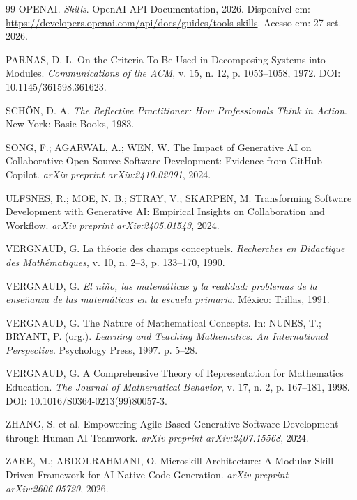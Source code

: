 \documentclass[preprint,12pt,authoryear]{elsarticle}
\begin{document}
\begin{thebibliography}{99}
OPENAI. \emph{Skills}. OpenAI API Documentation, 2026. Disponível em: \url{https://developers.openai.com/api/docs/guides/tools-skills}. Acesso em: 27 set. 2026.

PARNAS, D. L. On the Criteria To Be Used in Decomposing Systems into Modules. \emph{Communications of the ACM}, v. 15, n. 12, p. 1053--1058, 1972. DOI: 10.1145/361598.361623.

SCHÖN, D. A. \emph{The Reflective Practitioner: How Professionals Think in Action}. New York: Basic Books, 1983.

SONG, F.; AGARWAL, A.; WEN, W. The Impact of Generative AI on Collaborative Open-Source Software Development: Evidence from GitHub Copilot. \emph{arXiv preprint arXiv:2410.02091}, 2024.

ULFSNES, R.; MOE, N. B.; STRAY, V.; SKARPEN, M. Transforming Software Development with Generative AI: Empirical Insights on Collaboration and Workflow. \emph{arXiv preprint arXiv:2405.01543}, 2024.

VERGNAUD, G. La théorie des champs conceptuels. \emph{Recherches en Didactique des Mathématiques}, v. 10, n. 2--3, p. 133--170, 1990.

VERGNAUD, G. \emph{El niño, las matemáticas y la realidad: problemas de la enseñanza de las matemáticas en la escuela primaria}. México: Trillas, 1991.

VERGNAUD, G. The Nature of Mathematical Concepts. In: NUNES, T.; BRYANT, P. (org.). \emph{Learning and Teaching Mathematics: An International Perspective}. Psychology Press, 1997. p. 5--28.

VERGNAUD, G. A Comprehensive Theory of Representation for Mathematics Education. \emph{The Journal of Mathematical Behavior}, v. 17, n. 2, p. 167--181, 1998. DOI: 10.1016/S0364-0213(99)80057-3.

ZHANG, S. et al. Empowering Agile-Based Generative Software Development through Human-AI Teamwork. \emph{arXiv preprint arXiv:2407.15568}, 2024.

ZARE, M.; ABDOLRAHMANI, O. Microskill Architecture: A Modular Skill-Driven Framework for AI-Native Code Generation. \emph{arXiv preprint arXiv:2606.05720}, 2026.
\end{thebibliography}
\end{document}
